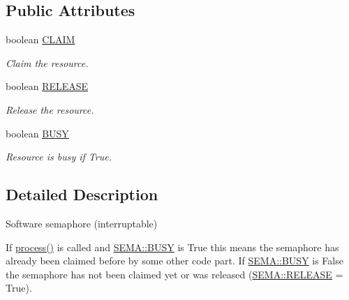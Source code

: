 \subsection*{Public Attributes}
\begin{DoxyCompactItemize}
\item 
\hypertarget{class_s_e_m_a_a6d50fd4f36d3de131968fc4199e97a68}{boolean \hyperlink{class_s_e_m_a_a6d50fd4f36d3de131968fc4199e97a68}{C\+L\+A\+I\+M}}\label{class_s_e_m_a_a6d50fd4f36d3de131968fc4199e97a68}

\begin{DoxyCompactList}\small\item\em Claim the resource. \end{DoxyCompactList}\item 
\hypertarget{class_s_e_m_a_a2660b1bd98ee2aac42e34d10179d6a4f}{boolean \hyperlink{class_s_e_m_a_a2660b1bd98ee2aac42e34d10179d6a4f}{R\+E\+L\+E\+A\+S\+E}}\label{class_s_e_m_a_a2660b1bd98ee2aac42e34d10179d6a4f}

\begin{DoxyCompactList}\small\item\em Release the resource. \end{DoxyCompactList}\item 
\hypertarget{class_s_e_m_a_af4df5a7c16c99bfc19f4902046ba26f9}{boolean \hyperlink{class_s_e_m_a_af4df5a7c16c99bfc19f4902046ba26f9}{B\+U\+S\+Y}}\label{class_s_e_m_a_af4df5a7c16c99bfc19f4902046ba26f9}

\begin{DoxyCompactList}\small\item\em Resource is busy if True. \end{DoxyCompactList}\end{DoxyCompactItemize}


\subsection{Detailed Description}
Software semaphore (interruptable) 

If \hyperlink{class_s_e_m_a_acf691410eccec2dafad4f12f9a5e4302}{process()} is called and \hyperlink{class_s_e_m_a_af4df5a7c16c99bfc19f4902046ba26f9}{S\+E\+M\+A\+::\+B\+U\+S\+Y} is True this means the semaphore has already been claimed before by some other code part. If \hyperlink{class_s_e_m_a_af4df5a7c16c99bfc19f4902046ba26f9}{S\+E\+M\+A\+::\+B\+U\+S\+Y} is False the semaphore has not been claimed yet or was released (\hyperlink{class_s_e_m_a_a2660b1bd98ee2aac42e34d10179d6a4f}{S\+E\+M\+A\+::\+R\+E\+L\+E\+A\+S\+E} = True).


